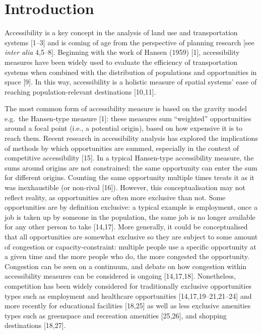 \documentclass[10pt,letterpaper]{article}
\begin{document}

\linenumbers

\hypertarget{introduction}{%
\section{Introduction}\label{introduction}}

Accessibility is a key concept in the analysis of land use and
transportation systems {[}1--3{]} and is coming of age from the
perspective of planning research {[}see \emph{inter alia} 4,5--8{]}.
Beginning with the work of Hansen (1959) {[}1{]}, accessibility measures
have been widely used to evaluate the efficiency of transportation
systems when combined with the distribution of populations and
opportunities in space {[}9{]}. In this way, accessibility is a holistic
measure of spatial systems' ease of reaching population-relevant
destinations {[}10,11{]}.

The most common form of accessibility measure is based on the gravity
model e.g.~the Hansen-type measure {[}1{]}: these measures sum
``weighted'' opportunities around a focal point (i.e., a potential
origin), based on how expensive it is to reach them. Recent research in
accessibility analysis has explored the implications of methods by which
opportunities are summed, especially in the context of competitive
accessibility {[}15{]}. In a typical Hansen-type accessibility measure,
the sums around origins are not constrained: the same opportunity can
enter the sum for different origins. Counting the same opportunity
multiple times treats it as it was inexhaustible (or non-rival
{[}16{]}). However, this conceptualisation may not reflect reality, as
opportunities are often more exclusive than not. Some opportunities are
by definition exclusive: a typical example is employment, once a job is
taken up by someone in the population, the same job is no longer
available for any other person to take {[}14,17{]}. More generally, it
could be conceptualised that all opportunities are somewhat exclusive so
they are subject to some amount of congestion or capacity-constraint:
multiple people use a specific opportunity at a given time and the more
people who do, the more congested the opportunity. Congestion can be
seen on a continuum, and debate on how congestion within accessibility
measures can be considered is ongoing {[}14,17,18{]}. Nonetheless,
competition has been widely considered for traditionally exclusive
opportunities types such as employment and healthcare opportunities
{[}14,17,19--21,21--24{]} and more recently for educational facilities
{[}18,25{]} as well as less exclusive amenities types such as greenspace
and recreation amenities {[}25,26{]}, and shopping destinations
{[}18,27{]}.
\end{document}
